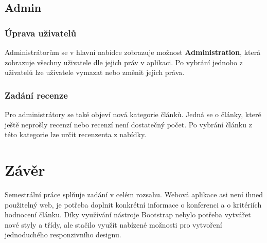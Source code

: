 \documentclass[czech,SP]{thesiskiv}
\begin{document}
\section{Admin}

\subsection{Úprava uživatelů}
Administrátorům se v hlavní nabídce zobrazuje možnost \textbf{Administration}, která zobrazuje všechny uživatele dle jejich práv v aplikaci.
Po vybrání jednoho z uživatelů lze uživatele vymazat nebo změnit jejich práva.
\subsection{Zadání recenze}
Pro administrátory se také objeví nová kategorie článků. Jedná se o články, které ještě neprošly recenzí nebo recenzí není dostatečný počet.
Po vybrání článku z této kategorie lze určit recenzenta z nabídky.

%
%
\chapter{Závěr}
\par
Semestrální práce splňuje zadání v celém rozsahu. Webová aplikace asi není ihned použitelný web, je potřeba doplnit konkrétní informace o konferenci a
o kritériích hodnocení článku.
Díky využívání nástroje Bootstrap nebylo potřeba vytvářet nové styly a třídy, ale stačilo využít nabízené možnosti pro vytvoření
jednoduchého responzivního designu.
\end{document}
